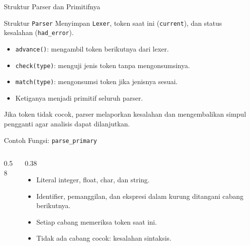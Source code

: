 \documentclass[aspectratio=169,10pt,t]{beamer}
\begin{document}
\begin{frame}{Struktur Parser dan Primitifnya}
  \begin{block}{Struktur \texttt{Parser}}
    \small
    Menyimpan \texttt{Lexer}, token saat ini (\texttt{current}), dan
    status kesalahan (\texttt{had\_error}).
  \end{block}

  \begin{itemize}
    \item \texttt{advance()}: mengambil token berikutnya dari lexer.
    \item \texttt{check(type)}: menguji jenis token tanpa
          mengonsumsinya.
    \item \texttt{match(type)}: mengonsumsi token jika jenisnya sesuai.
    \item Ketiganya menjadi primitif seluruh parser.
  \end{itemize}

  \vspace{3pt}
  {\footnotesize\color{ubbblue!80}Jika token tidak cocok, parser
  melaporkan kesalahan dan mengembalikan simpul pengganti agar
  analisis dapat dilanjutkan.}
\end{frame}

\begin{frame}[fragile]{Contoh Fungsi: \texttt{parse\_primary}}
  \begin{columns}[T,onlytextwidth]
    \begin{column}{0.58\textwidth}
      
    \end{column}
    \begin{column}{0.38\textwidth}
      \begin{itemize}
        \item Literal integer, float, char, dan string.
        \item Identifier, pemanggilan, dan ekspresi dalam kurung
              ditangani cabang berikutnya.
        \item Setiap cabang memeriksa token saat ini.
        \item Tidak ada cabang cocok: kesalahan sintaksis.
      \end{itemize}
    \end{column}
  \end{columns}
\end{frame}
\end{document}
